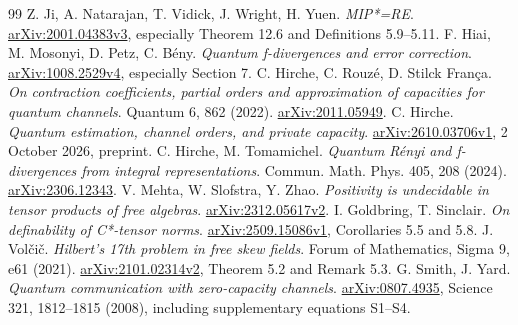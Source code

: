\documentclass[11pt]{article}
\begin{document}
\clearpage
\begin{thebibliography}{99}
 Z. Ji, A. Natarajan, T. Vidick, J. Wright, H. Yuen.
\emph{MIP*=RE}. \href{https://arxiv.org/abs/2001.04383v3}{arXiv:2001.04383v3},
especially Theorem 12.6 and Definitions 5.9--5.11.
 F. Hiai, M. Mosonyi, D. Petz, C. B\'eny.
\emph{Quantum f-divergences and error correction}.
\href{https://arxiv.org/abs/1008.2529v4}{arXiv:1008.2529v4}, especially Section 7.
 C. Hirche, C. Rouz\'e, D. Stilck Fran\c ca.
\emph{On contraction coefficients, partial orders and approximation of capacities
for quantum channels}. Quantum 6, 862 (2022).
\href{https://arxiv.org/abs/2011.05949}{arXiv:2011.05949}.
 C. Hirche. \emph{Quantum estimation, channel orders, and private
capacity}. \href{https://arxiv.org/abs/2610.03706v1}{arXiv:2610.03706v1},
2 October 2026, preprint.
 C. Hirche, M. Tomamichel. \emph{Quantum R\'enyi and f-divergences
from integral representations}. Commun. Math. Phys. 405, 208 (2024).
\href{https://arxiv.org/abs/2306.12343}{arXiv:2306.12343}.
 V. Mehta, W. Slofstra, Y. Zhao.
\emph{Positivity is undecidable in tensor products of free algebras}.
\href{https://arxiv.org/abs/2312.05617v2}{arXiv:2312.05617v2}.
 I. Goldbring, T. Sinclair.
\emph{On definability of C*-tensor norms}.
\href{https://arxiv.org/abs/2509.15086v1}{arXiv:2509.15086v1},
Corollaries 5.5 and 5.8.
 J. Vol\v ci\v c. \emph{Hilbert's 17th problem in free skew fields}.
Forum of Mathematics, Sigma 9, e61 (2021).
\href{https://arxiv.org/abs/2101.02314v2}{arXiv:2101.02314v2},
Theorem 5.2 and Remark 5.3.
 G. Smith, J. Yard.
\emph{Quantum communication with zero-capacity channels}.
\href{https://arxiv.org/abs/0807.4935}{arXiv:0807.4935},
Science 321, 1812--1815 (2008), including supplementary equations S1--S4.
\end{thebibliography}
\end{document}
